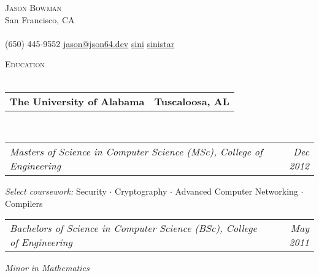 \documentclass[12pt,letterpaper]{article}
\makeatletter
\newcommand{\area}[2]{\emph{#1:}   #2}
\newcommand{\lineunder}{\vspace*{-8pt} \\ \hspace*{-18pt} \hrulefill \\}
\newcommand{\header}[1]{{\hspace*{-15pt}\vspace*{6pt} \textsc{#1}} \vspace*{-6pt} \lineunder}
\newcommand{\contact}[3]{
\vspace*{-8pt}
\begin{center}
{\LARGE \scshape {#1}}\\
#2 \lineunder 
#3
\end{center}
\vspace*{-8pt}
}
\newcommand{\headerrow}[2]
{\begin{tabular*}{\linewidth}{l@{\extracolsep{\fill}}r}
	#1 &
	#2 \\
\end{tabular*}}
\newcommand{\education}[5]{
	\headerrow
		{\textbf{#1}}
		{\textbf{#2}}
	\\
	\headerrow
		{\emph{#3}}
		{\emph{#4}}
    #5
}
\makeatother
\begin{document}
\small
\smallskip
\vspace*{-30pt}

\contact{Jason Bowman}
{San Francisco, CA}
{\faPhone \hspace{0.1em} (650) 445-9552 \hspace{0.1em} \faEnvelope \hspace{0.1em}
  \href{mailto:sinistar@gmail.com}{jason@json64.dev} \hspace{0.1em} \faGithub \hspace{0.1em} \href{https://www.github.com/sini}{sini} \hspace{0.1em} \hspace{0.1em} \faLinkedin \hspace{0.1em}
  \href{https://linkedin.com/in/sinistar}{sinistar}}

\vspace*{3pt}

\header{Education}
\education{The University of Alabama}{Tuscaloosa, AL}{Masters of Science in
  Computer Science (MSc), College of Engineering}{Dec 2012}{
	\begin{itemize*}
		\item \area{Select
    coursework}{Security $\cdot$ Cryptography $\cdot$ Advanced Computer
    Networking $\cdot$ Compilers}
	\end{itemize*}
	\headerrow{\emph{Bachelors of Science in Computer Science (BSc), College of
      Engineering}}{\emph{May 2011}}
	\begin{itemize*}
  \item \emph{Minor in Mathematics}
	\end{itemize*}
}

\end{document}
